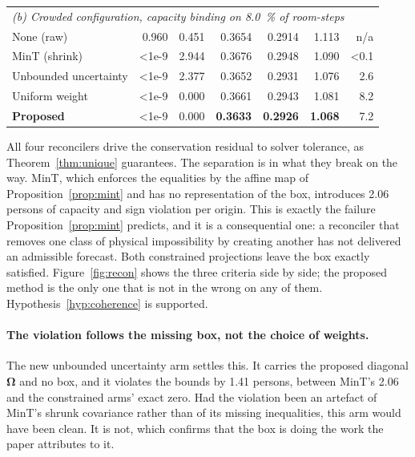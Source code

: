 \documentclass[utf8]{FrontiersinHarvard}
\newif\ifrevisionmarkup
\newcommand{\new}[1]{\ifrevisionmarkup\textcolor{revision}{#1}\else#1\fi}
\newif\ifsecondrevisionmarkup
\newcommand{\rev}[1]{\ifsecondrevisionmarkup\textcolor{revisiontwo}{#1}\else#1\fi}
\theoremstyle{plain}
\theoremstyle{definition}
\theoremstyle{remark}
\newcommand{\bOm}{\bm{\Omega}}
\newcommand{\best}[1]{\textbf{#1}}
\begin{document}
\begin{table}[htbp]
\begin{tabular}{lrrrrrr}
\midrule
\multicolumn{7}{l}{\emph{\new{(b) Crowded configuration, capacity binding on \SI{8.0}{\percent} of room-steps}}}\\
None (raw)              & \num{0.960} & \num{0.451} & 0.3654 & 0.2914 & 1.113 & n/a \\
MinT (shrink)           & \num{<1e-9} & \num{2.944} & 0.3676 & 0.2948 & 1.090 & \num{<0.1} \\
\new{Unbounded uncertainty} & \num{<1e-9} & \num{2.377} & 0.3652 & 0.2931 & 1.076 & 2.6 \\
Uniform weight          & \num{<1e-9} & \num{0.000} & 0.3661 & 0.2943 & 1.081 & 8.2 \\
\textbf{Proposed}       & \num{<1e-9} & \num{0.000} & \best{0.3633} & \best{0.2926} & \best{\rev{1.068}} & 7.2 \\
\bottomrule
\end{tabular}
\end{table}

All \new{four} reconcilers drive the conservation residual to solver tolerance, as Theorem~\ref{thm:unique} guarantees. The separation is in what they break on the way. MinT, which enforces the equalities by the \new{affine} map of Proposition~\ref{prop:mint} and has no representation of the box, introduces \new{\num{2.06}} persons of capacity and sign violation per origin. This is exactly the failure Proposition~\ref{prop:mint} predicts, and it is a consequential one: a reconciler that removes one class of physical impossibility by creating another has not delivered an admissible forecast. Both constrained projections leave the box exactly satisfied. Figure~\ref{fig:recon} shows the three criteria side by side; the proposed method is the only one that is not in the wrong on any of them. Hypothesis~\ref{hyp:coherence} is supported.

\new{\paragraph{The violation follows the missing box, not the choice of weights.} The new unbounded uncertainty arm settles this. It carries the proposed diagonal $\bOm$ and no box, and it violates the bounds by \num{1.41} persons, between MinT's \num{2.06} and the constrained arms' exact zero. Had the violation been an artefact of MinT's shrunk covariance rather than of its missing inequalities, this arm would have been clean. It is not, which confirms that the box is doing the work the paper attributes to it.}
\end{document}
